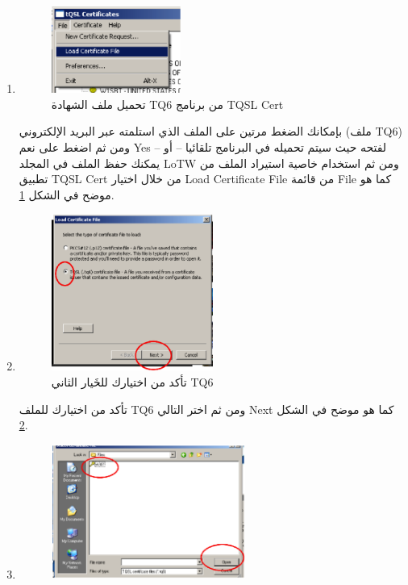 \documentclass[a4paper,12pt]{article}
\begin{document}
	\begin{enumerate}
		\item
		\begin{figure}[!hbtp]
		\centering
		\includegraphics[width=0.4\textwidth]{loadcert.eps}
		\caption{تحميل ملف الشهادة TQ6 من برنامج \textenglish{TQSL Cert}}
		\label{fig:LoadTQ6}
		\end{figure}
			بإمكانك الضغط مرتين على الملف الذي استلمته عبر البريد الإلكتروني (ملف \textenglish{TQ6}) ومن ثم اضغط على نعم \textenglish{Yes} لفتحه حيث سيتم تحميله في البرنامج تلقائيا -- أو -- يمكنك حفظ الملف في المجلد \textenglish{LoTW} ومن ثم استخدام خاصية
		  استيراد الملف من تطبيق \textenglish{TQSL Cert} من خلال اختيار \textenglish{Load Certificate File}
		  من قائمة \textenglish{File} كما هو موضح في الشكل \ref{fig:LoadTQ6}.
\clearpage
		\item
		\begin{figure}[!hbtp]
		\centering
		\includegraphics[width=0.5\textwidth]{tq6.eps}
		\caption{تأكد من اختيارك للخَيار الثاني TQ6}
		\label{fig:selectTypeTQ6}
		\end{figure}
			تأكد من اختيارك للملف \textenglish{TQ6} ومن ثم اختر التالي \textenglish{Next} كما هو موضح في الشكل \ref{fig:selectTypeTQ6}.
		\item	
		\begin{figure}[!hbtp]
		\centering
		\includegraphics[width=0.6\textwidth]{selectfiletoload.eps}

\end{figure}
\end{enumerate}
\end{document}
